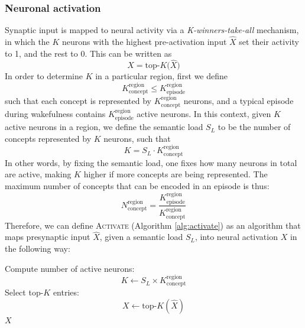 \documentclass{article}
\begin{document}
\subsubsection*{Neuronal activation}
Synaptic input is mapped to neural activity via a \textit{K-winners-take-all} mechanism, in which the $K$ neurons with the highest pre-activation input $\hat{X}$ set their activity to 1, and the rest to 0. This can be written as
\begin{equation}
    X = \textrm{top-}K\big(\hat{X}\big)
\end{equation}
In  order to determine $K$ in a particular region, first we define
\begin{equation}
    K^\textrm{region}_\textrm{concept} \leq K^\textrm{region}_\textrm{episode}
\end{equation}
 such that each concept is represented by $K^\textrm{region}_\textrm{concept}$ neurons, and a typical episode during wakefulness contains $K^\textrm{region}_\textrm{episode}$ active neurons. In this context, given $K$ active neurons in a region, we define the semantic load $S_L$ to be the number of concepts represented by $K$ neurons, such that
 \begin{equation}
     K = S_L \cdot K^\textrm{region}_\textrm{concept}
     \label{eq:semantic_load}
 \end{equation}
In other words, by fixing the semantic load, one fixes how many neurons in total are active, making $K$ higher if more concepts are being represented. The maximum number of concepts that can be encoded in an episode is thus:
 \begin{equation}
     N^\textrm{region}_\textrm{concept} = \frac{K^\textrm{region}_\textrm{episode}}{K^\textrm{region}_\textrm{concept}}
 \end{equation}
 Therefore, we can define \textsc{Activate} (Algorithm \ref{alg:activate}) as an algorithm that maps presynaptic input $\hat{X}$, given a semantic load $S_L$, into neural activation $X$ in the following way:
\begin{algorithm}[h!]
\caption{Neuronal Activation}\label{alg:activate}
\begin{algorithmic}[1]
    \State Compute number of active neurons:
        \[
            K \gets S_L \times K^\textrm{region}_\textrm{concept}
        \]
    \State Select top-$K$ entries:
        \[
            X \gets \textrm{top-}K(\hat{X})
        \]
    \State \Return $X$
\EndFunction
\end{algorithmic}
\end{algorithm}
\end{document}
